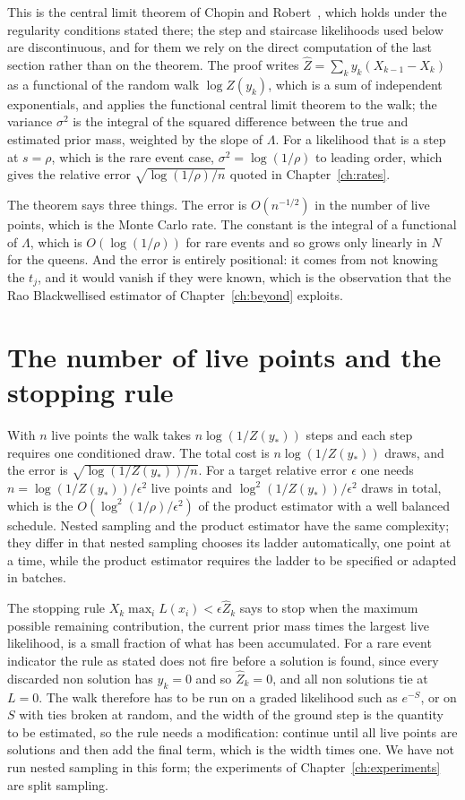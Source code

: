 This is the central limit theorem of Chopin and Robert~\cite{ChopinRobert}, which holds under the regularity conditions stated there; the step and staircase likelihoods used below are discontinuous, and for them we rely on the direct computation of the last section rather than on the theorem. The proof writes $\hat Z = \sum_k y_k (X_{k-1} - X_k)$ as a functional of the random walk $\log Z(y_k)$, which is a sum of independent exponentials, and applies the functional central limit theorem to the walk; the variance $\sigma^2$ is the integral of the squared difference between the true and estimated prior mass, weighted by the slope of $\Lambda$. For a likelihood that is a step at $s = \rho$, which is the rare event case, $\sigma^2 = \log(1/\rho)$ to leading order, which gives the relative error $\sqrt{\log(1/\rho) / n}$ quoted in Chapter~\ref{ch:rates}.

The theorem says three things. The error is $O(n^{-1/2})$ in the number of live points, which is the Monte Carlo rate. The constant is the integral of a functional of $\Lambda$, which is $O(\log(1/\rho))$ for rare events and so grows only linearly in $N$ for the queens. And the error is entirely positional: it comes from not knowing the $t_j$, and it would vanish if they were known, which is the observation that the Rao Blackwellised estimator of Chapter~\ref{ch:beyond} exploits.

\section{The number of live points and the stopping rule}

With $n$ live points the walk takes $n \log(1/Z(y_*))$ steps and each step requires one conditioned draw. The total cost is $n \log(1/Z(y_*))$ draws, and the error is $\sqrt{\log(1/Z(y_*)) / n}$. For a target relative error $\epsilon$ one needs $n = \log(1/Z(y_*)) / \epsilon^2$ live points and $\log^2(1/Z(y_*)) / \epsilon^2$ draws in total, which is the $O(\log^2(1/\rho) / \epsilon^2)$ of the product estimator with a well balanced schedule. Nested sampling and the product estimator have the same complexity; they differ in that nested sampling chooses its ladder automatically, one point at a time, while the product estimator requires the ladder to be specified or adapted in batches.

The stopping rule $X_k \max_i L(x_i) < \epsilon \hat Z_k$ says to stop when the maximum possible remaining contribution, the current prior mass times the largest live likelihood, is a small fraction of what has been accumulated. For a rare event indicator the rule as stated does not fire before a solution is found, since every discarded non solution has $y_k = 0$ and so $\hat Z_k = 0$, and all non solutions tie at $L = 0$. The walk therefore has to be run on a graded likelihood such as $e^{-S}$, or on $S$ with ties broken at random, and the width of the ground step is the quantity to be estimated, so the rule needs a modification: continue until all live points are solutions and then add the final term, which is the width times one. We have not run nested sampling in this form; the experiments of Chapter~\ref{ch:experiments} are split sampling.

